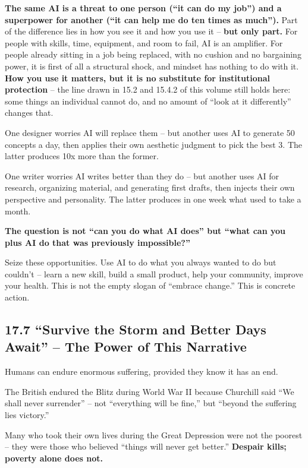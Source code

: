 \documentclass[11pt,a4paper]{article}
\begin{document}
\textbf{The same AI is a threat to one person (``it can do my job'') and a superpower for another (``it can help me do ten times as much'').} Part of the difference lies in how you see it and how you use it -- \textbf{but only part.} For people with skills, time, equipment, and room to fail, AI is an amplifier. For people already sitting in a job being replaced, with no cushion and no bargaining power, it is first of all a structural shock, and mindset has nothing to do with it. \textbf{How you use it matters, but it is no substitute for institutional protection} -- the line drawn in 15.2 and 15.4.2 of this volume still holds here: some things an individual cannot do, and no amount of ``look at it differently'' changes that.

One designer worries AI will replace them -- but another uses AI to generate 50 concepts a day, then applies their own aesthetic judgment to pick the best 3. The latter produces 10x more than the former.

One writer worries AI writes better than they do -- but another uses AI for research, organizing material, and generating first drafts, then injects their own perspective and personality. The latter produces in one week what used to take a month.

\textbf{The question is not ``can you do what AI does'' but ``what can you plus AI do that was previously impossible?''}

Seize these opportunities. Use AI to do what you always wanted to do but couldn't -- learn a new skill, build a small product, help your community, improve your health. This is not the empty slogan of ``embrace change.'' This is concrete action.

\subsection{17.7 ``Survive the Storm and Better Days Await'' -- The Power of This Narrative}

Humans can endure enormous suffering, provided they know it has an end.

The British endured the Blitz during World War II because Churchill said ``We shall never surrender'' -- not ``everything will be fine,'' but ``beyond the suffering lies victory.''

Many who took their own lives during the Great Depression were not the poorest -- they were those who believed ``things will never get better.'' \textbf{Despair kills; poverty alone does not.}
\end{document}
